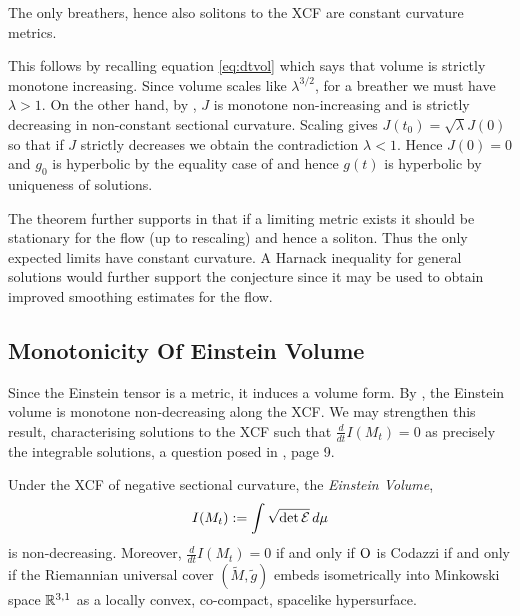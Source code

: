 \documentclass[a4paper,12pt]{amsart}
\begin{document}
\begin{thm}[{\cite{MR2302600}}]
The only breathers, hence also solitons to the XCF are constant curvature metrics.
\end{thm}

This follows by recalling equation \eqref{eq:dtvol} which says that volume is strictly monotone increasing. Since volume scales like \(\lambda^{3/2}\), for a breather we must have \(\lambda > 1\). On the other hand, by , $J$ is monotone non-increasing and is strictly decreasing in non-constant sectional curvature. Scaling gives \(J(t_0) = \sqrt{\lambda} J(0)\) so that if \(J\) strictly decreases we obtain the contradiction \(\lambda < 1\). Hence \(J(0) = 0\) and \(g_0\) is hyperbolic by the equality case of  and hence \(g(t)\) is hyperbolic by uniqueness of solutions.

The theorem further supports  in that if a limiting metric exists it should be stationary for the flow (up to rescaling) and hence a soliton. Thus the only expected limits have constant curvature. A Harnack inequality for general solutions would further support the conjecture since it may be used to obtain improved smoothing estimates for the flow.

\subsection{Monotonicity Of Einstein Volume}
\label{subsec:xcf_volume}

Since the Einstein tensor is a metric, it induces a volume form. By \cite[Proposition 9]{MR2055396}, the Einstein volume is monotone non-decreasing along the XCF. We may strengthen this result, characterising solutions to the XCF such that \(\frac{d}{dt} I(M_t) = 0\) as precisely the integrable solutions, a question posed in \cite{MR2055396}, page 9.

\begin{thm}
\label{thm:volume_monotonicity}
Under the XCF of negative sectional curvature, the \emph{Einstein Volume},
\[
I(M_t):=\int \sqrt{\det\operatorname{\mathcal{E}}}\,d\mu
\]
is non-decreasing. Moreover, \(\frac{d}{dt} I(M_t)= 0\) if and only if \(\operatorname{O}\) is Codazzi if and only if the Riemannian universal cover \((\tilde{M}, \tilde{g})\) embeds isometrically into Minkowski space \(\mathbb{R}^{3,1}\) as a locally convex, co-compact, spacelike hypersurface.
\end{thm}
\end{document}
